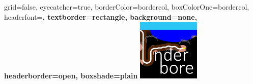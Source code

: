 \documentclass[a0paper,portrait,fontscale=0.27]{baposter}
\begin{document}


\begin{poster}{
	grid=false,
	eyecatcher=true, 
	borderColor=bordercol,
	boxColorOne=bordercol,
	headerfont=\Large\bf, 
	textborder=rectangle,
	background=none,
	headerborder=open,
    boxshade=plain
}
{
\includegraphics[height=8em]{figs/preview-down-crop-square-narrow.png}
}
{\bf
}
\end{poster}
\end{document}
